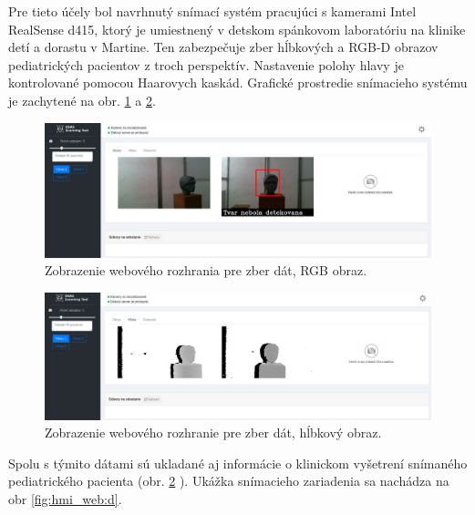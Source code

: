 Pre tieto účely bol navrhnutý snímací systém pracujúci s kamerami Intel RealSense d415, ktorý je umiestnený v detskom spánkovom laboratóriu na klinike detí a dorastu v Martine. Ten zabezpečuje zber hĺbkových a RGB-D obrazov pediatrických pacientov z troch perspektív. Nastavenie polohy hlavy je kontrolované pomocou Haarovych kaskád. Grafické prostredie snímacieho systému je zachytené na obr. \ref{fig:hmi_web:a} a \ref{fig:hmi_web:b}.
 

\begin{figure}[H]
	\centering
	\includegraphics[width=\textwidth]{figures/hmi_web1.png}
	\caption{Zobrazenie webového rozhrania pre zber dát, RGB obraz.}
	\label{fig:hmi_web:a}
\end{figure}

\begin{figure}[H]
	\centering
	\includegraphics[width=\textwidth]{figures/hmi_web2.png}
	\caption{Zobrazenie webového rozhranie pre zber dát, hĺbkový obraz.}
	\label{fig:hmi_web:b}
\end{figure}

Spolu s týmito dátami sú ukladané aj informácie o klinickom vyšetrení snímaného pediatrického pacienta (obr. \ref{fig:hmi_web:b} ). Ukážka snímacieho zariadenia sa nachádza na obr \ref{fig:hmi_web:d}. 
